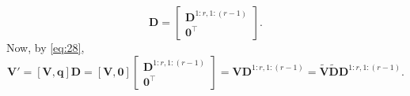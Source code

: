 \documentclass[11pt,a4paper]{article}
\theoremstyle{break}
\numberwithin{dummy}{section}
\theoremstyle{plain}
\theoremstyle{plain}
\theoremstyle{plain}
\theoremstyle{plain}
\theoremstyle{plain}
\theoremstyle{MyNonumberplain}
\newcommand{\0}{\M{0}}
\newcommand{\M}[1]{\mathbf{#1}}
\newcommand{\Mt}[1]{\tilde{\M{#1}}}
\newcommand{\T}{\top}
\newcommand{\ve}[1]{\mathbf{#1}}
\begin{document}
\begin{enumerate}[font=\upshape,label=(\roman*),wide,align=right]
\begin{displaymath}
    \M{D}
    =
    \begin{bmatrix}
      \M{D}^{1:r,1:(r-1)}
      \\
      \0^\T
    \end{bmatrix}.
  \end{displaymath}
  Now, by \eqref{eq:28},
  \begin{displaymath}
    \M{V}' = [\M{V}, \ve{q}] \M{D}
    = [\M{V}, \0]
    \begin{bmatrix}
      \M{D}^{1:r,1:(r-1)}
      \\
      \0^\T
    \end{bmatrix}
    =
    \M{V} \M{D}^{1:r,1:(r-1)}
    =
    \Mt{V} \Mt{D} \M{D}^{1:r,1:(r-1)}.
  \end{displaymath}

\end{enumerate}
\end{document}
